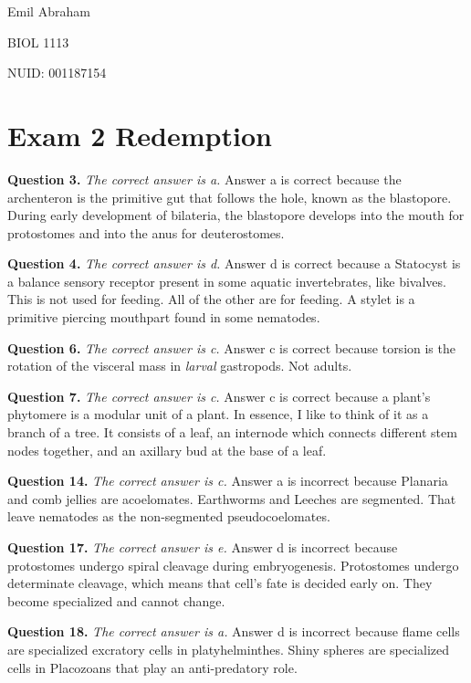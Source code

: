 \documentclass{article}
\begin{document}
{\parskip=0pt
\noindent Emil Abraham\par
\noindent BIOL 1113\par
\noindent NUID: 001187154}

\section*{Exam 2 Redemption}

\textbf{Question 3.} \textit{The correct answer is a.} Answer a is correct
because the archenteron is the primitive gut that follows the hole, known as the
blastopore. During early development of bilateria, the blastopore develops into
the mouth for protostomes and into the anus for deuterostomes.

\textbf{Question 4.} \textit{The correct answer is d.} Answer d is correct
because a Statocyst is a balance sensory receptor present in some aquatic
invertebrates, like bivalves. This is not used for feeding. All of the other are
for feeding. A stylet is a primitive piercing mouthpart found in some nematodes.

\textbf{Question 6.} \textit{The correct answer is c.} Answer c is correct
because torsion is the rotation of the visceral mass in \textit{larval}
gastropods. Not adults.

\textbf{Question 7.} \textit{The correct answer is c.} Answer c is correct
because a plant's phytomere is a modular unit of a plant. In essence, I like to
think of it as a branch of a tree. It consists of a leaf, an internode which
connects different stem nodes together, and an axillary bud at the base of a
leaf.

\textbf{Question 14.} \textit{The correct answer is c.} Answer a is incorrect
because Planaria and comb jellies are acoelomates. Earthworms and Leeches are
segmented. That leave nematodes as the non-segmented pseudocoelomates.

\textbf{Question 17.} \textit{The correct answer is e.} Answer d is incorrect
because protostomes undergo spiral cleavage during embryogenesis. Protostomes
undergo determinate cleavage, which means that cell's fate is decided early on.
They become specialized and cannot change.

\textbf{Question 18.} \textit{The correct answer is a.} Answer d is incorrect
because flame cells are specialized excratory cells in platyhelminthes. Shiny
spheres are specialized cells in Placozoans that play an anti-predatory role.
\end{document}
